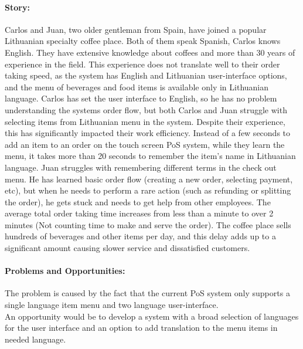\documentclass{article}
\begin{document}
\paragraph{\small Story:} Carlos and Juan, two older gentleman from Spain, have joined a popular Lithuanian specialty coffee place. Both of them speak Spanish, Carlos knows English. They have extensive knowledge about coffees and more than 30 years of experience in the field. This experience does not translate well to their order taking speed, as the system has English and Lithuanian user-interface options, and the menu of beverages and food items is available only in Lithuanian language. Carlos has set the user interface to English, so he has no problem understanding the systems order flow, but both Carlos and Juan struggle with selecting items from Lithuanian menu in the system. Despite their experience, this has significantly impacted their work efficiency. Instead of a few seconds to add an item to an order on the touch screen PoS system, while they learn the menu, it takes more than 20 seconds to remember the item's name in Lithuanian language. Juan struggles with remembering different terms in the check out menu. He has learned basic order flow (creating a new order, selecting payment, etc), but when he needs to perform a rare action (such as refunding or splitting the order), he gets stuck and needs to get help from other employees. The average total order taking time increases from less than a minute to over 2 minutes (Not counting time to make and serve the order). The coffee place sells hundreds of beverages and other items per day, and this delay adds up to a significant amount causing slower service and dissatisfied customers.

\paragraph{\small Problems and Opportunities:} The problem is caused by the fact that the current PoS system only supports a single language item menu and two language user-interface.\\ An opportunity would be to develop a system with a broad selection of languages for the user interface and an option to add translation to the menu items in needed language.
\end{document}
